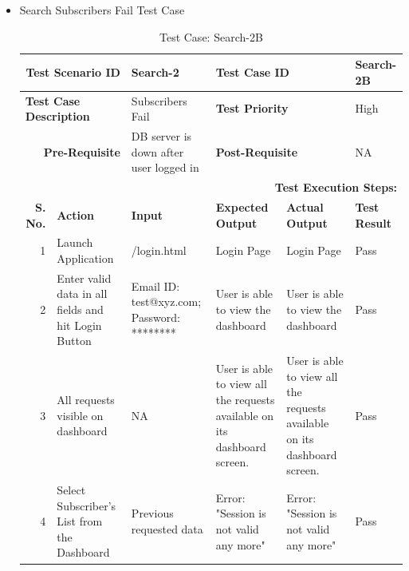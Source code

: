 \documentclass[a4paper, hidelinks, 12pt]{report}
\begin{document}
\begin{itemize}
\item{Search Subscribers Fail Test Case}
\begin{table}[H]
  \centering
  \caption{Test Case: Search-2B}
    \begin{tabular}{|r|p{4.355em}|p{7.715em}|p{6.43em}|p{5.855em}|p{5.07em}|}
    \toprule
    \multicolumn{2}{|p{13.425em}|}{\textbf{Test Scenario ID}} & Search-2 & \multicolumn{2}{p{12.285em}|}{\textbf{Test Case ID}} & Search-2B \\
    \midrule
    \multicolumn{2}{|l|}{\multirow{2}[2]{*}{\textbf{Test Case Description}}} & \multirow{2}[2]{*}{Subscribers Fail} & \multicolumn{2}{l|}{\multirow{2}[2]{*}{\textbf{Test Priority}}} & \multirow{2}[2]{*}{High} \\
    \multicolumn{2}{|l|}{} & \multicolumn{1}{l|}{} & \multicolumn{2}{l|}{} & \multicolumn{1}{l|}{} \\
    \midrule
    \multicolumn{2}{|p{13.425em}|}{\textbf{Pre-Requisite}} & DB server is down after user logged in & \multicolumn{2}{p{12.285em}|}{\textbf{Post-Requisite}} & NA \\
    \midrule
    \multicolumn{6}{p{38.495em}|}{\textbf{Test Execution Steps:}} \\
    \midrule
    \multicolumn{1}{|p{5.07em}|}{\textbf{S. No.}} & \textbf{Action } & \textbf{Input} & \textbf{Expected Output} & \textbf{Actual Output} & \textbf{Test Result} \\
    \midrule
    1     & Launch Application & /login.html & Login Page & Login Page & Pass \\
    \midrule
    2     & Enter valid data in all fields and hit Login Button & Email ID: test@xyz.com; Password: ******** & User is able to view the dashboard & User is able to view the dashboard & Pass \\
    \midrule
    3     & All requests visible on dashboard & NA    & User is able to view all the requests available on its dashboard screen. & User is able to view all the requests available on its dashboard screen. & Pass \\
    \midrule
    4     & Select Subscriber's List from the Dashboard & Previous requested data & Error: "Session is not valid any more" & Error: "Session is not valid any more" & Pass \\
    \bottomrule
    \end{tabular}%
  \label{tab:Test Case: Search-2B}%
\end{table}%
\end{itemize}
\end{document}
